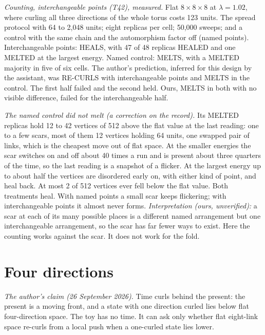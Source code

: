 \documentclass[aps,pre,10pt,twocolumn,superscriptaddress,nofootinbib]{revtex4-2}
\begin{document}
\emph{Counting, interchangeable points (T42), measured.} Flat $8 \times 8 \times 8$ at $\lambda = 1.02$, where
curling all three directions of the whole torus costs 123 units. The spread protocol with 64 to 2,048 units; eight
replicas per cell; 50,000 sweeps; and a control with the same chain and the automorphism factor off (named points).
Interchangeable points: HEALS, with 47 of 48 replicas HEALED and one MELTED at the largest energy. Named control:
MELTS, with a MELTED majority in five of six cells. The author's prediction, inferred for this design by the
assistant, was RE-CURLS with interchangeable points and MELTS in the control. The first half failed and the second
held. Ours, MELTS in both with no visible difference, failed for the interchangeable half.

\emph{The named control did not melt (a correction on the record).} Its MELTED replicas hold 12 to 42 vertices of
512 above the flat value at the last reading: one to a few scars, most of them 12 vertices holding 64 units,
one swapped pair of links, which is the cheapest move out of flat space. At the smaller energies the scar switches
on and off about 40 times a run and is present about three quarters of the time, so the last reading is a snapshot
of a flicker. At the largest energy up to about half the vertices are disordered early on, with either kind of
point, and heal back. At most 2 of 512 vertices ever fell below the flat value. Both treatments heal. With named
points a small scar keeps flickering; with interchangeable points it almost never forms. \emph{Interpretation (ours,
unverified):} a scar at each of its many possible places is a different named arrangement but one interchangeable
arrangement, so the scar has far fewer ways to exist. Here the counting works against the scar. It does not work for
the fold.

\section{Four directions}\label{sec:four}

\emph{The author's claim (26 September 2026).} Time curls behind the present: the present is a moving front, and
a state with one direction curled lies below flat four-direction space. The toy has no time. It can ask only whether
flat eight-link space re-curls from a local push when a one-curled state lies lower.
\end{document}
